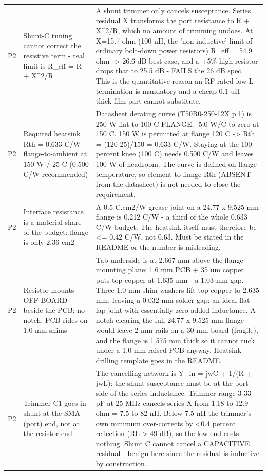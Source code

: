 \documentclass[11pt,a4paper]{article}
\begin{document}
{\begin{longtable}{lp{5.2cm}p{7.2cm}}
P2 & Shunt-C tuning cannot correct the resistive term - real limit is R\_eff = R + X\textasciicircum{}2/R & A shunt trimmer only cancels susceptance. Series residual X transforms the port resistance to R + X\textasciicircum{}2/R, which no amount of trimming undoes. At X=15.7 ohm (100 nH, the 'non-inductive' limit of ordinary bolt-down power resistors) R\_eff = 54.9 ohm -\textgreater{} 26.6 dB best case, and a +5\% high resistor drops that to 25.5 dB - FAILS the 26 dB spec. This is the quantitative reason an RF-rated low-L termination is mandatory and a cheap 0.1 uH thick-film part cannot substitute. \\
P2 & Required heatsink Rth = 0.633 C/W flange-to-ambient at 150 W / 25 C (0.500 C/W recommended) & Datasheet derating curve (T50R0-250-12X p.1) is 250 W flat to 100 C FLANGE, -5.0 W/C to zero at 150 C. 150 W is permitted at flange 120 C -\textgreater{} Rth = (120-25)/150 = 0.633 C/W. Staying at the 100 percent knee (100 C) needs 0.500 C/W and leaves 100 W of headroom. The curve is defined on flange temperature, so element-to-flange Rth (ABSENT from the datasheet) is not needed to close the requirement. \\
P2 & Interface resistance is a material share of the budget: flange is only 2.36 cm2 & A 0.5 C.cm2/W grease joint on a 24.77 x 9.525 mm flange is 0.212 C/W - a third of the whole 0.633 C/W budget. The heatsink itself must therefore be \textless{}= 0.42 C/W, not 0.63. Must be stated in the README or the number is misleading. \\
P2 & Resistor mounts OFF-BOARD beside the PCB; no notch. PCB rides on 1.0 mm shims & Tab underside is at 2.667 mm above the flange mounting plane; 1.6 mm PCB + 35 um copper puts top copper at 1.635 mm - a 1.03 mm gap. Three 1.0 mm shim washers lift top copper to 2.635 mm, leaving a 0.032 mm solder gap: an ideal flat lap joint with essentially zero added inductance. A notch clearing the full 24.77 x 9.525 mm flange would leave 2 mm rails on a 30 mm board (fragile), and the flange is 1.575 mm thick so it cannot tuck under a 1.0 mm-raised PCB anyway. Heatsink drilling template goes in the README. \\
P2 & Trimmer C1 goes in shunt at the SMA (port) end, not at the resistor end & The cancelling network is Y\_in = jwC + 1/(R + jwL): the shunt susceptance must be at the port side of the series inductance. Trimmer range 3-33 pF at 25 MHz cancels series X from 1.18 to 12.9 ohm = 7.5 to 82 nH. Below 7.5 nH the trimmer's own minimum over-corrects by \textless{}0.4 percent reflection (RL \textgreater{} 49 dB), so the low end costs nothing. Shunt C cannot cancel a CAPACITIVE residual - benign here since the residual is inductive by construction. \\

\end{longtable}}
\end{document}

